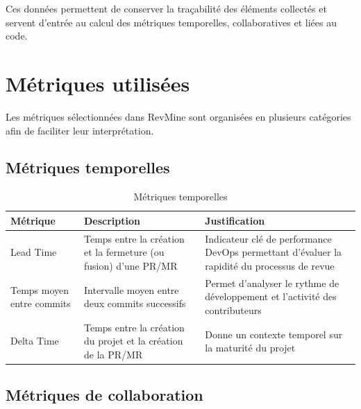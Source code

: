 Ces données permettent de conserver la traçabilité des éléments collectés et servent d’entrée au calcul des métriques temporelles, collaboratives et liées au code.



\section{Métriques utilisées}

Les métriques sélectionnées dans RevMine sont organisées en plusieurs catégories afin de faciliter leur interprétation.

\subsection{Métriques temporelles}

\begin{table}[H]
\centering
\begin{tabular}{|l|p{5cm}|p{6cm}|}
\hline
\textbf{Métrique} & \textbf{Description} & \textbf{Justification} \\
\hline
Lead Time & Temps entre la création et la fermeture (ou fusion) d’une PR/MR & Indicateur clé de performance DevOps permettant d’évaluer la rapidité du processus de revue \\
\hline
Temps moyen entre commits & Intervalle moyen entre deux commits successifs & Permet d’analyser le rythme de développement et l’activité des contributeurs \\
\hline
Delta Time & Temps entre la création du projet et la création de la PR/MR & Donne un contexte temporel sur la maturité du projet \\
\hline
\end{tabular}
\caption{Métriques temporelles}
\end{table}

\subsection{Métriques de collaboration}

